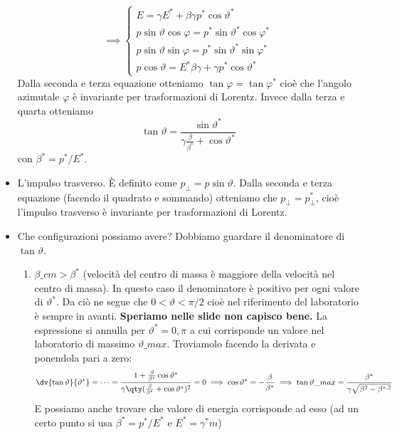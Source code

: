 \begin{itemize}
    \begin{equation*}
        \implies 
        \begin{cases}
            E=\gamma E^*+\beta\gamma p^*\cos\vartheta^*\\
            p\sin\vartheta\cos\varphi=p^*\sin\vartheta^*\cos\varphi^*\\
            p\sin\vartheta\sin\varphi=p^*\sin\vartheta^*\sin\varphi^*\\
            p\cos\vartheta=E^*\beta\gamma+\gamma p^*\cos\vartheta^*
        \end{cases}
    \end{equation*}
    Dalla seconda e terza equazione otteniamo $\tan\varphi=\tan\varphi^*$ cioè che l'angolo azimutale $\varphi$ è invariante per trasformazioni di Lorentz. Invece dalla terza e quarta otteniamo
    \begin{equation*}
    \tan \vartheta=\frac{\sin\vartheta^*}{\gamma\frac\beta{\beta^*}+\cos\vartheta^*}
    \end{equation*}
    con $\beta^*=p^*/E^*$.
    \item L'impulso trasverso. È definito come $p_\perp=p\sin\vartheta$. Dalla seconda e terza equazione (facendo il quadrato e sommando) otteniamo che $p_\perp=p_\perp^*$, cioè l'impulso trasverso è invariante per trasformazioni di Lorentz. 
    \item Che configurazioni possiamo avere? Dobbiamo guardare il denominatore di $\tan\vartheta$.
    \begin{enumerate}
        \item $\beta\_{cm}>\beta^*$ (velocità del centro di massa è maggiore della velocità nel centro di massa). In questo caso il denominatore è positivo per ogni valore di $\vartheta^*$. Da ciò ne segue che $0<\vartheta<\pi/2$ cioè nel riferimento del laboratorio è sempre in avanti. \textbf{Speriamo nelle slide non capisco bene.} La espressione si annulla per $\vartheta^*=0,\pi$ a cui corrisponde un valore nel laboratorio di massimo $\vartheta\_{max}$. Troviamolo facendo la derivata e ponendola pari a zero:
        \begin{equation*}
            \dv{\tan\vartheta}{\vartheta^*}=\dots=\frac{1+\frac\beta{\beta^*}\cos\vartheta^*}{\gamma\qty(\frac\beta{\beta^*}+\cos\vartheta^*)^2}=0\implies \cos\vartheta^*=-\frac\beta{\beta^*}\implies \tan\vartheta\_{max}=\frac{\beta^*}{\gamma\sqrt{\beta^2-\beta^{*,2}}}
        \end{equation*}
        E possiamo anche trovare che valore di energia corrisponde ad esso (ad un certo punto si usa $\beta^*=p^*/E^*$ e $E^*=\gamma^*m$)

\end{enumerate}
\end{itemize}
